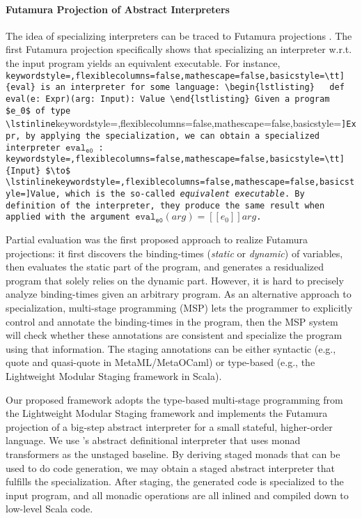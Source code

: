 \paragraph{Futamura Projection of Abstract Interpreters}

The idea of specializing interpreters can be traced to Futamura
projections \cite{Futamura1999, futamura1971partial}.  The first
Futamura projection specifically shows that specializing an
interpreter w.r.t. the input program yields an equivalent
executable. For instance, \lstinline[keywordstyle=,flexiblecolumns=false,mathescape=false,basicstyle=\tt]{eval} is an interpreter for some language:
\begin{lstlisting}
  def eval(e: Expr)(arg: Input): Value
\end{lstlisting}
Given a program $e_0$ of type \lstinline[keywordstyle=,flexiblecolumns=false,mathescape=false,basicstyle=\tt]{Expr}, by applying the specialization,
we can obtain a specialized interpreter $\texttt{eval}_{\texttt{e0}}$
: \lstinline[keywordstyle=,flexiblecolumns=false,mathescape=false,basicstyle=\tt]{Input} $\to$ \lstinline[keywordstyle=,flexiblecolumns=false,mathescape=false,basicstyle=\tt]{Value}, which is the so-called \textit{equivalent
  executable}.  By definition of the interpreter, they produce the
same result when applied with the argument
$\texttt{eval}_{\texttt{e0}}(arg) = [\![ e_0 ]\!] arg $.

Partial evaluation \cite{DBLP:books/daglib/0072559} was the first
proposed approach to realize Futamura projections: it first discovers
the binding-times (\textit{static} or \textit{dynamic}) of variables,
then evaluates the static part of the program, and generates a
residualized program that solely relies on the dynamic part. However,
it is hard to precisely analyze binding-times given an arbitrary
program.  As an alternative approach to specialization, multi-stage
programming (MSP) \cite{taha1999multi, DBLP:conf/pepm/TahaS97} lets
the programmer to explicitly control and annotate the binding-times in
the program, then the MSP system will check whether these annotations
are consistent and specialize the program using that information.  The
staging annotations can be either syntactic (e.g., quote and
quasi-quote in MetaML/MetaOCaml) or type-based (e.g., the Lightweight
Modular Staging framework \cite{DBLP:conf/gpce/RompfO10} in Scala).

Our proposed framework adopts the type-based multi-stage programming
from the Lightweight Modular Staging framework and implements the
Futamura projection of a big-step abstract interpreter for a small
stateful, higher-order language.  We use
\citet{DBLP:journals/pacmpl/DaraisLNH17}'s abstract definitional
interpreter that uses monad transformers as the unstaged baseline. By
deriving staged monads that can be used to do code generation, we may
obtain a staged abstract interpreter that fulfills the specialization.
After staging, the generated code is specialized to the input program,
and all monadic operations are all inlined and compiled down to
low-level Scala code.

